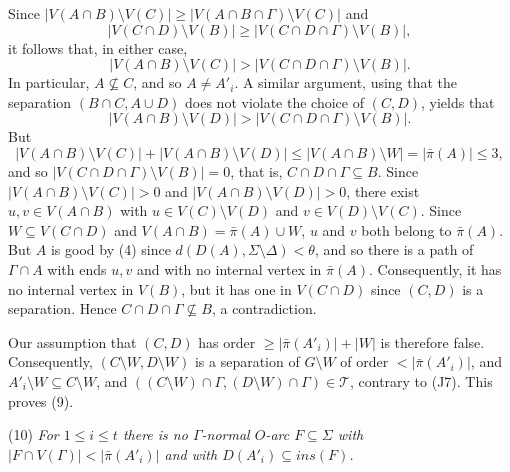 Since $|V(A \cap B) \setminus V(C)| \ge |V(A \cap B \cap \Gamma) \setminus V(C)|$ and
\begin{equation*}
|V(C \cap D) \setminus V(B)| \ge |V(C \cap D \cap \Gamma) \setminus V(B)|,
\end{equation*}
it follows that, in either case,
\begin{equation*}
|V(A \cap B) \setminus V(C)| > |V(C \cap D \cap \Gamma) \setminus V(B)|.
\end{equation*}
In particular, $A \not\subseteq C$, and so $A \ne A'_i$. A similar argument, using that the separation $(B \cap C, A \cup D)$ does not violate the choice of $(C, D)$, yields that
\begin{equation*}
|V(A \cap B) \setminus V(D)| > |V(C \cap D \cap \Gamma) \setminus V(B)|.
\end{equation*}
But
\begin{equation*}
|V(A \cap B) \setminus V(C)| + |V(A \cap B) \setminus V(D)| \le |V(A \cap B) \setminus W| = |\bar{\pi}(A)| \le 3,
\end{equation*}
and so $|V(C \cap D \cap \Gamma) \setminus V(B)| = 0$, that is, $C \cap D \cap \Gamma \subseteq B$. Since $|V(A \cap B) \setminus V(C)| > 0$ and $|V(A \cap B) \setminus V(D)| > 0$, there exist $u, v \in V(A \cap B)$ with $u \in V(C) \setminus V(D)$ and $v \in V(D) \setminus V(C)$. Since $W \subseteq V(C \cap D)$ and $V(A \cap B) = \bar{\pi}(A) \cup W$, $u$ and $v$ both belong to $\bar{\pi}(A)$. But $A$ is good by (4) since $d(D(A), \Sigma \setminus \Delta) < \theta$, and so there is a path of $\Gamma \cap A$ with ends $u, v$ and with no internal vertex in $\bar{\pi}(A)$. Consequently, it has no internal vertex in $V(B)$, but it has one in $V(C \cap D)$ since $(C, D)$ is a separation. Hence $C \cap D \cap \Gamma \not\subseteq B$, a contradiction.

Our assumption that $(C, D)$ has order $\ge |\bar{\pi}(A'_i)| + |W|$ is therefore false. Consequently, $(C \setminus W, D \setminus W)$ is a separation of $G \setminus W$ of order $< |\bar{\pi}(A'_i)|$, and $A'_i \setminus W \subseteq C \setminus W$, and $((C \setminus W) \cap \Gamma, (D \setminus W) \cap \Gamma) \in \mathcal{T}$, contrary to (J7). This proves (9).

\hspace*{12pt}(10) \textit{For $1 \le i \le t$ there is no $\Gamma$-normal $O$-arc $F \subseteq \Sigma$ with $|F \cap V(\Gamma)| < |\bar{\pi}(A'_i)|$ and with $D(A'_i) \subseteq ins(F)$.}

